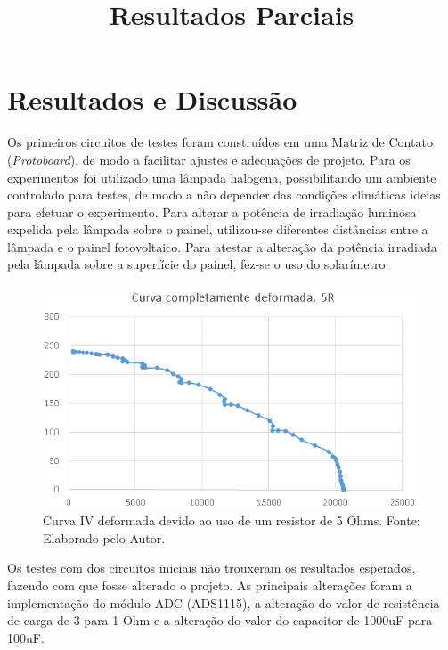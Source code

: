 \chapter{Resultados e Discussão}
\label{cap:04}

\title{Resultados Parciais}

Os primeiros circuitos de testes foram construídos em uma Matriz de Contato (\textit{Protoboard}), de modo a facilitar ajustes e adequações de projeto. Para os experimentos foi utilizado uma lâmpada halogena, possibilitando um ambiente controlado para testes, de modo a não depender das condições climáticas ideias para efetuar o experimento. Para alterar a potência de irradiação luminosa expelida pela lâmpada sobre o painel, utilizou-se diferentes distâncias entre a lâmpada e o painel fotovoltaico. Para atestar a alteração da potência irradiada pela lâmpada sobre a superfície do painel, fez-se o uso do solarímetro.

\FloatBarrier
\begin{figure}[!htbp]
	\centering
	\includegraphics[scale=1]{imagens/CurvaIVdeformadaII}
	\caption{Curva IV deformada devido ao uso de um resistor de 5 Ohms. Fonte: Elaborado pelo Autor. 	}
	\label{fig:CurvaIVdeformadaII}
\end{figure}
\FloatBarrier


Os testes com dos circuitos iniciais não trouxeram os resultados esperados, fazendo com que fosse alterado o projeto. As principais alterações foram a implementação do módulo ADC (ADS1115), a alteração do valor de resistência de carga de 3 para 1 Ohm e a alteração do valor do capacitor de 1000uF para 100uF.

